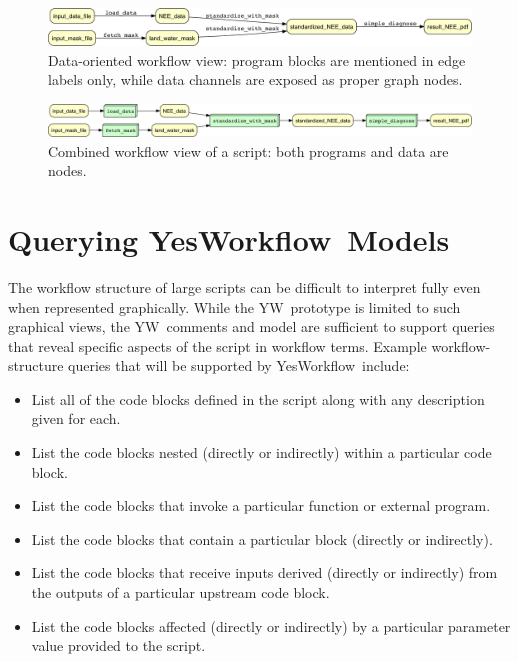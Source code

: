 \documentclass{article}
\newcommand{\YW}{\textsf{YesWorkflow}}
\newcommand{\yw}{\textsf{YW}}
\newcommand{\YWT}{\textsf{YesWorkflow}}
\begin{document}
 \begin{figure}[h]
   \centering
   \includegraphics[width=1.0\textwidth]{figures/example_data-crop.pdf}
   \caption{Data-oriented workflow view: program blocks are mentioned
     in edge labels only, while data channels are exposed as proper
     graph nodes.}
   \label{fig-simple-data}
 \end{figure}

 \begin{figure}[h]
   \centering
   \includegraphics[width=1.0\textwidth]{figures/example_comb-crop.pdf}
   \caption{Combined workflow view of a script: both programs and data
   are nodes.}
   \label{fig-simple-combined}
 \end{figure}



\section{Querying \YWT\ Models}\label{sec-querying}

The workflow structure of large scripts can be difficult to interpret
fully even when represented graphically.  While the \yw\
prototype is limited to such graphical views, the \yw\ comments and
model are sufficient to support queries that reveal specific aspects
of the script in workflow terms.  Example
workflow-structure queries that will be supported by \YW\ include:
%
\begin{itemize}
\item List all of the code blocks defined in the script along with any description given for each.
\item List the code blocks nested (directly or indirectly) within a particular code block.
\item List the code blocks that invoke a particular function or external program.
\item List the code blocks that contain a particular block (directly or indirectly).
\item List the code blocks that receive inputs derived (directly or indirectly) from the outputs of a particular upstream code block.
\item List the code blocks affected (directly or indirectly) by a particular parameter value provided to the script.
\end{itemize}
\end{document}
